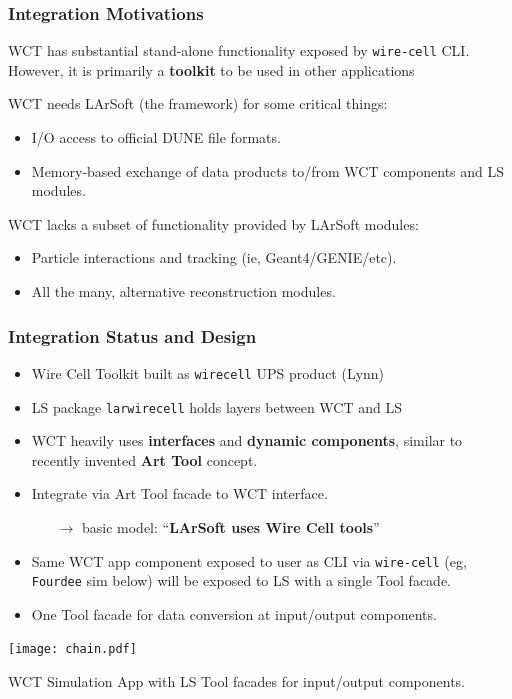 \documentclass[xcolor=dvipsnames]{beamer}
\begin{document}
\begin{frame}
  \frametitle{Integration Motivations}

  WCT has substantial stand-alone functionality exposed by
  \texttt{wire-cell} CLI.  However, it is primarily a
  \textbf{toolkit} to be used in other applications

  \vfill

  WCT needs LArSoft (the framework) for some critical things:
  \begin{itemize}
  \item I/O access to official DUNE file formats. 
  \item Memory-based exchange of data products to/from
    WCT components and LS modules.
  \end{itemize}

  \vfill

  WCT lacks a subset of functionality provided by LArSoft modules:
  \begin{itemize}
  \item Particle interactions and tracking (ie, Geant4/GENIE/etc).
  \item All the many, alternative reconstruction modules.
  \end{itemize}

\end{frame}


\begin{frame}[fragile]
  \frametitle{Integration Status and Design}
  \begin{itemize}\footnotesize
  \item Wire Cell Toolkit built as \texttt{wirecell} UPS product (Lynn)
  \item LS package \texttt{larwirecell} holds layers between WCT and LS
  \item WCT heavily uses \textbf{interfaces} and
    \textbf{dynamic components}, similar to recently invented
    \textbf{Art Tool} concept.
  \item Integrate via Art Tool facade to WCT interface.
    \begin{itemize}\scriptsize
    \item[$\to$] basic model: ``\textbf{LArSoft uses Wire Cell tools}''
    \end{itemize}
  \item Same WCT app component exposed to user as CLI via
    \texttt{wire-cell} (eg, \texttt{Fourdee} sim below) will be
    exposed to LS with a single Tool facade.
  \item One Tool facade for data conversion at input/output components.
  \end{itemize}

  \begin{center}
    \texttt{[image: chain.pdf]}
    
    \scriptsize
    WCT Simulation App with LS Tool facades for input/output components.
  \end{center}

\end{frame}
\end{document}
